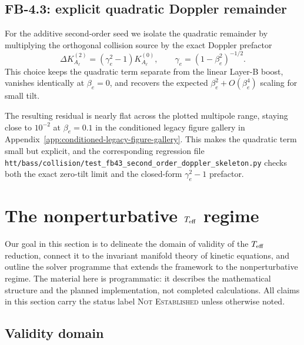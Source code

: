 \subsection{FB-4.3: explicit quadratic Doppler remainder}

For the additive second-order seed we isolate the quadratic
remainder by multiplying the orthogonal collision source by the
exact Doppler prefactor
\begin{equation}\label{eq:fb43-v2}
\Delta K^{(2)}_{A_\ell}
=
\left(\gamma_e^2 - 1\right) K^{(0)}_{A_\ell},
\qquad
\gamma_e = \left(1-\beta_e^2\right)^{-1/2}.
\end{equation}
This choice keeps the quadratic term separate from the linear
Layer-B boost, vanishes identically at $\beta_e = 0$, and
recovers the expected $\beta_e^2 + O(\beta_e^4)$ scaling for
small tilt.

The resulting residual is nearly flat across the plotted multipole
range, staying close to $10^{-2}$ at $\beta_e = 0.1$ in
the conditioned legacy figure gallery in Appendix~\ref{app:conditioned-legacy-figure-gallery}.  This makes the quadratic term
small but explicit, and the corresponding regression file
\texttt{htt/bass/collision/test\_fb43\_second\_order\_doppler\_skeleton.py}
checks both the exact zero-tilt limit and the closed-form
$\gamma_e^2 - 1$ prefactor.


\section{The nonperturbative $T_{\mathrm{eff}}$ regime}
\label{sec:nonperturbative}

Our goal in this section is to delineate the domain
of validity of the $T_{\mathrm{eff}}$ reduction, connect it to the
invariant manifold theory of kinetic equations, and
outline the solver programme that extends the framework
to the nonperturbative regime.  The material here is
programmatic: it describes the mathematical structure
and the planned implementation, not completed
calculations.  All claims in this section carry the
status label \textsc{Not Established} unless otherwise
noted.


\subsection{Validity domain}
\label{sec:validity-domain}

